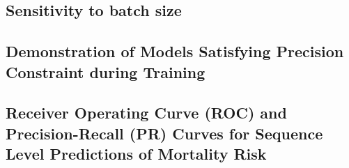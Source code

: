 \subsection{Sensitivity to batch size}



\subsection{Demonstration of Models Satisfying Precision Constraint during Training}



\subsection{Receiver Operating Curve (ROC) and Precision-Recall (PR) Curves for Sequence Level Predictions of Mortality Risk}
